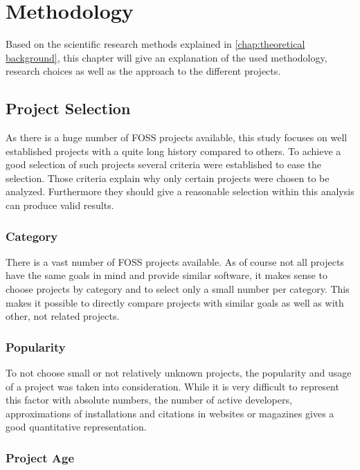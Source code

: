 \chapter{Methodology} %
\label{chap:methodology}

Based on the scientific research methods explained in \autoref{chap:theoretical
background}, this chapter will give an explanation of the used methodology,
research choices as well as the approach to the different projects.

\section{Project Selection} %

As there is a huge number of \ac{FOSS} projects available, this study focuses
on well established projects with a quite long history compared to others. To
achieve a good selection of such projects several criteria were established to
ease the selection. Those criteria explain why only certain projects were
chosen to be analyzed. Furthermore they should give a reasonable selection
within this analysis can produce valid results.

\subsection{Category} %

There is a vast number of \ac{FOSS} projects available. As of course not all
projects have the same goals in mind and provide similar software, it makes
sense to choose projects by category and to select only a small number per
category. This makes it possible to directly compare projects with similar
goals as well as with other, not related projects.


\subsection{Popularity} %

To not choose small or not relatively unknown projects, the popularity and
usage of a project was taken into consideration. While it is very difficult to
represent this factor with absolute numbers, the number of active developers,
approximations of installations and citations in websites or magazines gives a
good quantitative representation.


\subsection{Project Age} %

